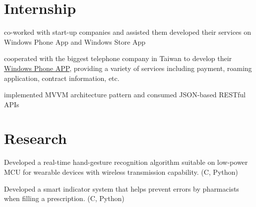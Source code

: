 \documentclass[letterpaper]{deedy-resume} %
\begin{document}
\begin{minipage}[t]{0.66\textwidth}

\section{Internship}


\begin{tightitemize}
\item co-worked with start-up companies and assisted them developed their services on Windows Phone App and Windows Store App
\end{tightitemize}
\sectionspace %


\begin{tightitemize}
\item cooperated with the biggest telephone company in Taiwan to develop their \href{https://goo.gl/udWQmx}{Windows Phone APP}, providing a variety of services including payment, roaming application, contract information, etc.
\item implemented MVVM architecture pattern and consumed JSON-based RESTful APIs
\end{tightitemize}
\sectionspace %


\section{Research}


Developed a real-time hand-gesture recognition algorithm suitable on low-power MCU for wearable devices with wireless transmission capability. (C, Python)


Developed a smart indicator system that helps prevent errors by pharmacists when filling a prescription. (C, Python)
\sectionspace %


\end{minipage}
\end{document}
